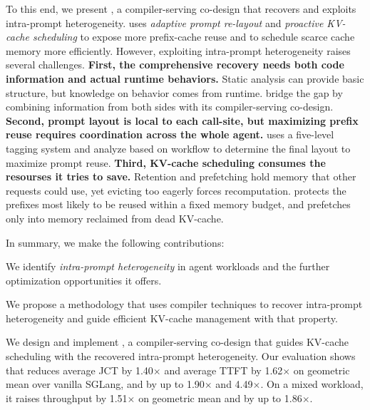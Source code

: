 To this end, we present \sysname, a compiler-serving co-design that recovers and exploits intra-prompt heterogeneity. \sysname uses \emph{adaptive prompt re-layout} and \emph{proactive KV-cache scheduling} to expose more prefix-cache reuse and to schedule scarce cache memory more efficiently. However, exploiting intra-prompt heterogeneity raises several challenges.
\textbf{First, the comprehensive recovery needs both code information and actual runtime behaviors.} Static analysis can provide basic structure, but knowledge on behavior comes from runtime. \sysname bridge the gap by combining information from both sides with its compiler-serving co-design. 
\textbf{Second, prompt layout is local to each call-site, but maximizing prefix reuse requires coordination across the whole agent.} \sysname uses a five-level tagging system and analyze based on workflow to determine the final layout to maximize prompt reuse. 
\textbf{Third, KV-cache scheduling consumes the resourses it tries to save.} Retention and prefetching hold memory that other requests could use, yet evicting too eagerly forces recomputation. \sysname protects the prefixes most likely to be reused within a fixed memory budget, and prefetches only into memory reclaimed from dead KV-cache.
 
In summary, we make the following contributions:
\begin{enumerate*}[label=\textbf{(\roman*)}]
    \item We identify \emph{intra-prompt heterogeneity} in agent workloads and the further optimization opportunities it offers.
    \item We propose a methodology that uses compiler techniques to recover intra-prompt heterogeneity and guide efficient KV-cache management with that property.
    \item We design and implement \sysname, a compiler-serving co-design that guides KV-cache scheduling with the recovered intra-prompt heterogeneity. Our evaluation shows that \sysname reduces average JCT by 1.40$\times$ and average TTFT by 1.62$\times$ on geometric mean over vanilla SGLang, and by up to 1.90$\times$ and 4.49$\times$. On a mixed workload, it raises throughput by 1.51$\times$ on geometric mean and by up to 1.86$\times$.
\end{enumerate*}